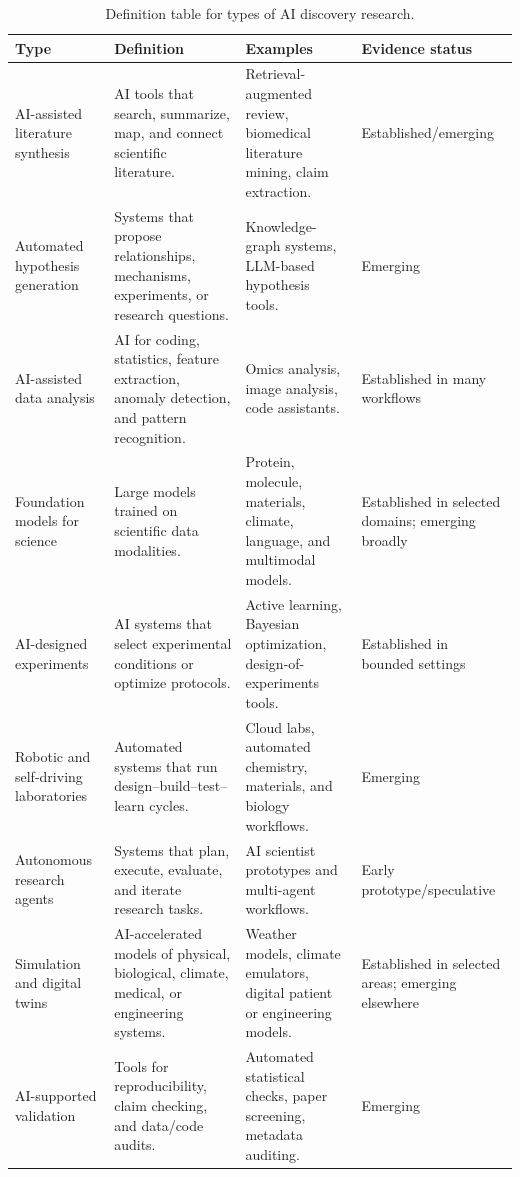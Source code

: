 \documentclass[12pt]{article}
\begin{document}
\begin{table}[H]
\centering
\caption{Definition table for types of AI discovery research.}
\small
\begin{tabularx}{\textwidth}{p{3.1cm}X p{3.3cm}p{2.5cm}}
\toprule
\textbf{Type} & \textbf{Definition} & \textbf{Examples} & \textbf{Evidence status} \\
\midrule
AI-assisted literature synthesis & AI tools that search, summarize, map, and connect scientific literature. & Retrieval-augmented review, biomedical literature mining, claim extraction. & Established/emerging \\
Automated hypothesis generation & Systems that propose relationships, mechanisms, experiments, or research questions. & Knowledge-graph systems, LLM-based hypothesis tools. & Emerging \\
AI-assisted data analysis & AI for coding, statistics, feature extraction, anomaly detection, and pattern recognition. & Omics analysis, image analysis, code assistants. & Established in many workflows \\
Foundation models for science & Large models trained on scientific data modalities. & Protein, molecule, materials, climate, language, and multimodal models. & Established in selected domains; emerging broadly \\
AI-designed experiments & AI systems that select experimental conditions or optimize protocols. & Active learning, Bayesian optimization, design-of-experiments tools. & Established in bounded settings \\
Robotic and self-driving laboratories & Automated systems that run design--build--test--learn cycles. & Cloud labs, automated chemistry, materials, and biology workflows. & Emerging \\
Autonomous research agents & Systems that plan, execute, evaluate, and iterate research tasks. & AI scientist prototypes and multi-agent workflows. & Early prototype/speculative \\
Simulation and digital twins & AI-accelerated models of physical, biological, climate, medical, or engineering systems. & Weather models, climate emulators, digital patient or engineering models. & Established in selected areas; emerging elsewhere \\
AI-supported validation & Tools for reproducibility, claim checking, and data/code audits. & Automated statistical checks, paper screening, metadata auditing. & Emerging \\
\bottomrule
\end{tabularx}
\end{table}
\end{document}
